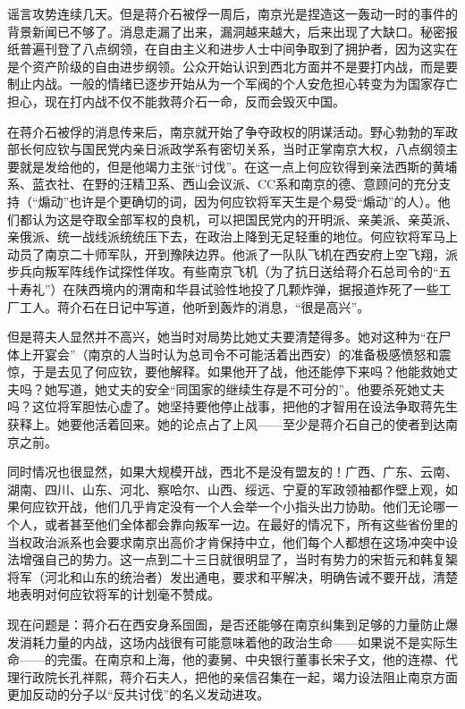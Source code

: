 \documentclass[10pt]{book}
\begin{document}
谣言攻势连续几天。但是蒋介石被俘一周后，南京光是捏造这一轰动一时的事件的背景新闻已不够了。消息走漏了出来，漏洞越来越大，后来出现了大缺口。秘密报纸普遍刊登了八点纲领，在自由主义和进步人士中间争取到了拥护者，因为这实在是个资产阶级的自由进步纲领。公众开始认识到西北方面并不是要打内战，而是要制止内战。一般的情绪已逐步开始从为一个军阀的个人安危担心转变为为国家存亡担心，现在打内战不仅不能救蒋介石一命，反而会毁灭中国。

在蒋介石被俘的消息传来后，南京就开始了争夺政权的阴谋活动。野心勃勃的军政部长何应钦与国民党内亲日派政学系有密切关系，当时正掌南京大权，八点纲领主要就是发给他的，但是他竭力主张“讨伐”。在这一点上何应钦得到亲法西斯的黄埔系、蓝衣社、在野的汪精卫系、西山会议派、CC系和南京的德、意顾问的充分支持（“煽动”也许是个更确切的词，因为何应钦将军天生是个易受“煽动”的人）。他们都认为这是夺取全部军权的良机，可以把国民党内的开明派、亲美派、亲英派、亲俄派、统一战线派统统压下去，在政治上降到无足轻重的地位。何应钦将军马上动员了南京二十师军队，开到豫陕边界。他派了一队队飞机在西安府上空飞翔，派步兵向叛军阵线作试探性佯攻。有些南京飞机（为了抗日送给蒋介石总司令的“五十寿礼”）在陕西境内的渭南和华县试验性地投了几颗炸弹，据报道炸死了一些工厂工人。蒋介石在日记中写道，他听到轰炸的消息，“很是高兴”。

但是蒋夫人显然并不高兴，她当时对局势比她丈夫要清楚得多。她对这种为“在尸体上开宴会”（南京的人当时认为总司令不可能活着出西安）的准备极感愤怒和震惊，于是去见了何应钦，要他解释。如果他开了战，他还能停下来吗？他能救她丈夫吗？她写道，她丈夫的安全“同国家的继续生存是不可分的”。他要杀死她丈夫吗？这位将军胆怯心虚了。她坚持要他停止战事，把他的才智用在设法争取蒋先生获释上。她要他活着回来。她的论点占了上风——至少是蒋介石自己的使者到达南京之前。

同时情况也很显然，如果大规模开战，西北不是没有盟友的！广西、广东、云南、湖南、四川、山东、河北、察哈尔、山西、绥远、宁夏的军政领袖都作壁上观，如果何应钦开战，他们几乎肯定没有一个人会举一个小指头出力协助。他们无论哪一个人，或者甚至他们全体都会靠向叛军一边。在最好的情况下，所有这些省份里的当权政治派系也会要求南京出高价才肯保持中立，他们每个人都想在这场冲突中设法增强自己的势力。这一点到二十三日就很明显了，当时有势力的宋哲元和韩复榘将军（河北和山东的统治者）发出通电，要求和平解决，明确告诫不要开战，清楚地表明对何应钦将军的计划毫不赞成。

现在问题是：蒋介石在西安身系囹圄，是否还能够在南京纠集到足够的力量防止爆发消耗力量的内战，这场内战很有可能意味着他的政治生命——如果说不是实际生命——的完蛋。在南京和上海，他的妻舅、中央银行董事长宋子文，他的连襟、代理行政院长孔祥熙，蒋介石夫人，把他的亲信召集在一起，竭力设法阻止南京方面更加反动的分子以“反共讨伐”的名义发动进攻。
\end{document}
